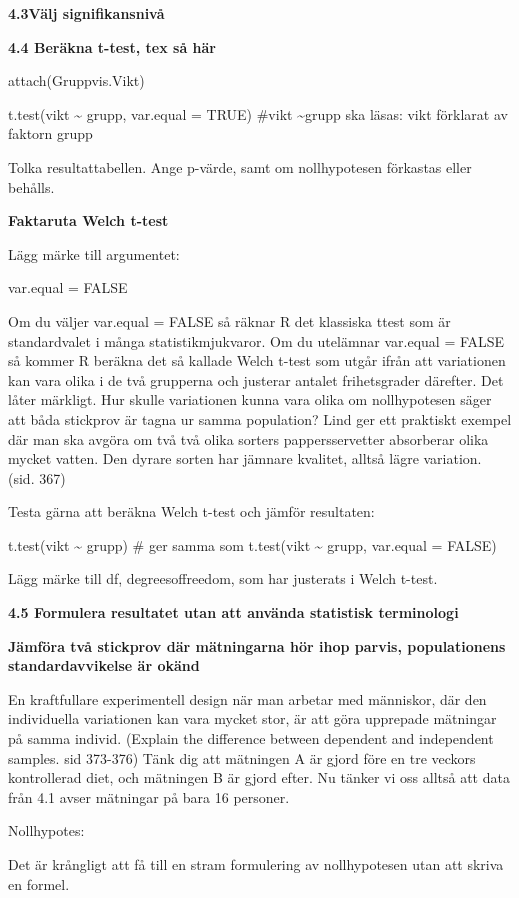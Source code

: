 \documentclass[
  letterpaper,
  DIV=11,
  numbers=noendperiod]{scrartcl}
\begin{document}
\textbf{4.3Välj signifikansnivå}

\textbf{4.4 Beräkna t-test, tex så här}

attach(Gruppvis.Vikt)

t.test(vikt \textasciitilde{} grupp, var.equal = TRUE) \#vikt
\textasciitilde grupp ska läsas: vikt förklarat av faktorn grupp

Tolka resultattabellen. Ange p-värde, samt om nollhypotesen förkastas
eller behålls.

\textbf{Faktaruta Welch t-test}

Lägg märke till argumentet:

var.equal = FALSE

Om du väljer var.equal = FALSE så räknar R det klassiska ttest som är
standardvalet i många statistikmjukvaror. Om du utelämnar var.equal =
FALSE så kommer R beräkna det så kallade Welch t-test som utgår ifrån
att variationen kan vara olika i de två grupperna och justerar antalet
frihetsgrader därefter. Det låter märkligt. Hur skulle variationen kunna
vara olika om nollhypotesen säger att båda stickprov är tagna ur samma
population? Lind ger ett praktiskt exempel där man ska avgöra om två två
olika sorters pappersservetter absorberar olika mycket vatten. Den
dyrare sorten har jämnare kvalitet, alltså lägre variation. (sid. 367)

Testa gärna att beräkna Welch t-test och jämför resultaten:

t.test(vikt \textasciitilde{} grupp) \# ger samma som t.test(vikt
\textasciitilde{} grupp, var.equal = FALSE)

Lägg märke till df, degreesoffreedom, som har justerats i Welch t-test.

\textbf{4.5 Formulera resultatet utan att använda statistisk
terminologi}

\textbf{Jämföra två stickprov där mätningarna hör ihop parvis,
populationens standardavvikelse är okänd}

En kraftfullare experimentell design när man arbetar med människor, där
den individuella variationen kan vara mycket stor, är att göra upprepade
mätningar på samma individ. (Explain the difference between dependent
and independent samples. sid 373-376) Tänk dig att mätningen A är gjord
före en tre veckors kontrollerad diet, och mätningen B är gjord efter.
Nu tänker vi oss alltså att data från 4.1 avser mätningar på bara 16
personer.

Nollhypotes:

Det är krångligt att få till en stram formulering av nollhypotesen utan
att skriva en formel.
\end{document}

